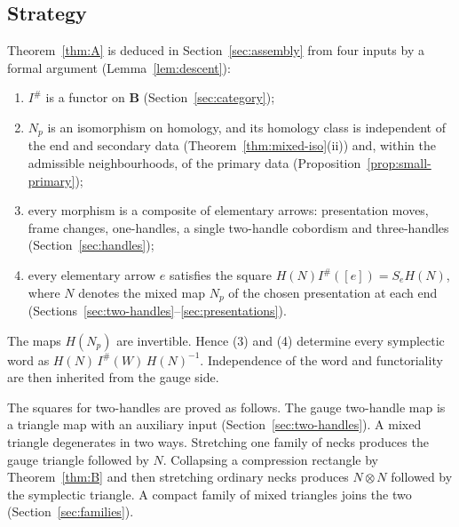 \documentclass[11pt]{amsart}
\theoremstyle{definition}
\theoremstyle{remark}
\theoremstyle{plain}
\numberwithin{equation}{section}
\newcommand{\bB}{\mathbf{B}}
\newcommand{\Ish}{I^{\#}}
\begin{document}
\subsection{Strategy}

Theorem~\ref{thm:A} is deduced in Section~\ref{sec:assembly} from four
inputs by a formal argument (Lemma~\ref{lem:descent}):
\begin{enumerate}[label=(\arabic*)]
\item $\Ish$ is a functor on $\bB$ (Section~\ref{sec:category});
\item $N_p$ is an isomorphism on homology, and its homology class is
  independent of the end and secondary data (Theorem~\ref{thm:mixed-iso}(ii)) and,
  within the admissible neighbourhoods, of the primary data
  (Proposition~\ref{prop:small-primary});
\item every morphism is a composite of elementary arrows: presentation
  moves, frame changes, one-handles, a single two-handle cobordism and
  three-handles (Section~\ref{sec:handles});
\item every elementary arrow $e$ satisfies the square
  $H(N)\Ish([e])=S_eH(N)$, where $N$ denotes the mixed map $N_p$ of the
  chosen presentation at each end
  (Sections~\ref{sec:two-handles}--\ref{sec:presentations}).
\end{enumerate}
The maps $H(N_p)$ are invertible. Hence (3) and (4) determine every
symplectic word as $H(N)\,\Ish(W)\,H(N)^{-1}$. Independence of the word and
functoriality are then inherited from the gauge side.

The squares for two-handles are proved as follows. The gauge two-handle
map is a triangle map with an auxiliary input
(Section~\ref{sec:two-handles}). A mixed triangle degenerates in two ways.
Stretching one family of necks produces the gauge triangle followed by
$N$. Collapsing a compression rectangle by Theorem~\ref{thm:B} and then
stretching ordinary necks produces $N\otimes N$ followed by the
symplectic triangle. A compact family of mixed triangles joins the two
(Section~\ref{sec:families}).
\end{document}
